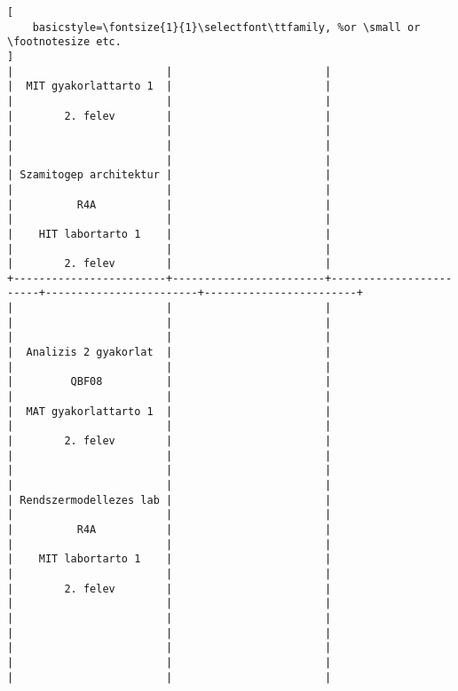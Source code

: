 \begin{lstlisting}[
    basicstyle=\fontsize{1}{1}\selectfont\ttfamily, %or \small or \footnotesize etc.
]
|                        |                        |                        |  MIT gyakorlattarto 1  |                        | 
|                        |                        |                        |        2. felev        |                        | 
|                        |                        |                        |                        |                        | 
|                        |                        |                        | Szamitogep architektur |                        | 
|                        |                        |                        |          R4A           |                        | 
|                        |                        |                        |    HIT labortarto 1    |                        | 
|                        |                        |                        |        2. felev        |                        | 
+------------------------+------------------------+------------------------+------------------------+------------------------+
|                        |                        |                        |                        |                        | 
|                        |                        |                        |  Analizis 2 gyakorlat  |                        | 
|                        |                        |                        |         QBF08          |                        | 
|                        |                        |                        |  MAT gyakorlattarto 1  |                        | 
|                        |                        |                        |        2. felev        |                        | 
|                        |                        |                        |                        |                        | 
|                        |                        |                        | Rendszermodellezes lab |                        | 
|                        |                        |                        |          R4A           |                        | 
|                        |                        |                        |    MIT labortarto 1    |                        | 
|                        |                        |                        |        2. felev        |                        | 
|                        |                        |                        |                        |                        | 
|                        |                        |                        |                        |                        | 
|                        |                        |                        |                        |                        | 

\end{lstlisting}
